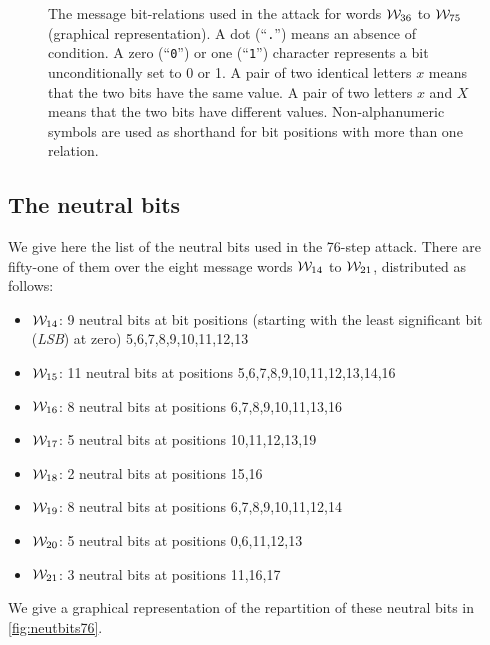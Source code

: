 \begin{figure}[ht]
\centering
  \theverbbox
  \caption{The message bit-relations used in the attack for words $\mathcal{W}_{36}$ to $\mathcal{W}_{75}$ (graphical representation).
  A dot (``\texttt{.}'') means an absence of condition. A zero (``\texttt{0}'') or one (``\texttt{1}'') character represents a bit unconditionally set to 0 or 1.
  A pair of two identical letters $x$ means that the two bits have the same value. A pair of two
  letters $x$ and $X$ means that the two bits have different values.
  Non-alphanumeric symbols are used as shorthand for bit positions with more than one relation.
  \label{fig:msgbitrel76_graph}}
\end{figure}

\subsection{The neutral bits}
\label{sec:neutral_bits}
We give here the list of the neutral bits used in the 76-step attack.
There are fifty-one of them over the eight message words
$\mathcal{W}_{14}$ to $\mathcal{W}_{21}$, distributed as
follows:
\begin{itemize}
\item $\mathcal{W}_{14}$: 9 neutral bits at  bit positions (starting with the least significant bit (\emph{LSB}) at zero) 5,6,7,8,9,10,11,12,13
\item $\mathcal{W}_{15}$: 11 neutral bits at positions 5,6,7,8,9,10,11,12,13,14,16
\item $\mathcal{W}_{16}$: 8 neutral bits at positions 6,7,8,9,10,11,13,16
\item $\mathcal{W}_{17}$: 5 neutral bits at positions 10,11,12,13,19
\item $\mathcal{W}_{18}$: 2 neutral bits at positions 15,16
\item $\mathcal{W}_{19}$: 8 neutral bits at positions 6,7,8,9,10,11,12,14
\item $\mathcal{W}_{20}$: 5 neutral bits at positions 0,6,11,12,13
\item $\mathcal{W}_{21}$: 3 neutral bits at positions 11,16,17
\end{itemize}
We give a graphical representation of the repartition of these neutral bits in \autoref{fig:neutbits76}.

